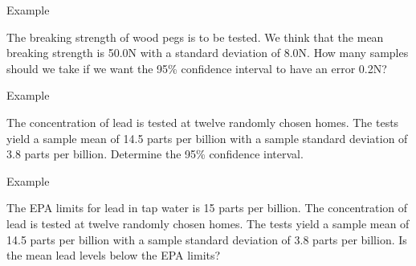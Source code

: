 \begin{frame}{Example}

  The breaking strength of wood pegs is to be tested. We think that
  the mean breaking strength is 50.0N with a standard deviation of
  8.0N. How many samples should we take if we want the 95\% confidence
  interval to have an error 0.2N?
  
\end{frame}


\begin{frame}{Example}

  The concentration of lead is tested at twelve randomly chosen
  homes. The tests yield a sample mean of 14.5 parts per billion with
  a sample standard deviation of 3.8 parts per billion. Determine the
  95\% confidence interval.
  
\end{frame}

\begin{frame}{Example}

  The EPA limits for lead in tap water is 15 parts per billion.  The
  concentration of lead is tested at twelve randomly chosen homes. The
  tests yield a sample mean of 14.5 parts per billion with a sample
  standard deviation of 3.8 parts per billion. Is the mean lead levels
  below the EPA limits?
  
\end{frame}


